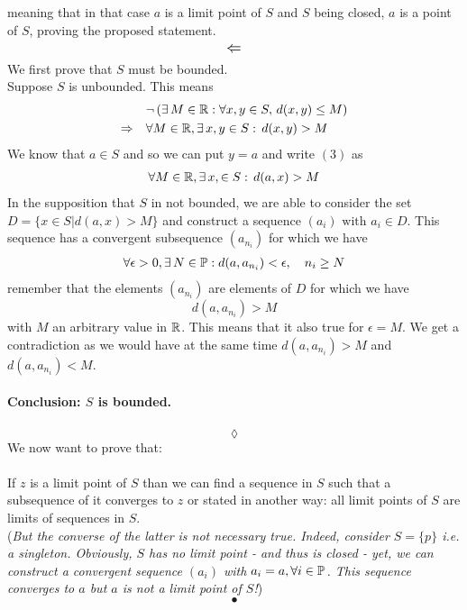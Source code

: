 meaning that in that case $a$ is a limit point of $S$ and $S$ being closed, $a$ is a point of $S$, proving the proposed statement.\newpage
$$\mathbf{\mathlarger{\Leftarrow}}$$
We first prove that $S$ must be bounded.\\
Suppose $S$ is unbounded. This means
\begin{align}
&\neg\left(\exists\, M\in\mathbb{R}:\forall x,y\in S,\, d(x,y)\leq M\right)\\
\Rightarrow\quad &\forall M\in\mathbb{R},\exists\, x,y\in S:\, d(x,y)> M
\end{align}
We know that $a\in S$ and so we can put $y=a$ and write  $(3)$ as 
\begin{align*}
\forall M\in\mathbb{R},\exists\, x,\in S:\, d(a,x)> M
\end{align*}
In the supposition that $S$ in not bounded, we are able to consider the set $D=\{ x\in S|d(a,x)>M\}$ and construct a sequence $(a_i)\text{ with } a_i\in D$. This sequence has a convergent subsequence $(a_{n_i})$ for which we have 
\begin{align*}
\forall \epsilon>0,\exists\, N\in\mathbb{P}: d(a,a_{n_i})<\epsilon,\quad  n_i\geq N
\end{align*}
remember that the elements $(a_{n_i})$ are elements of $D$ for which we have 
$$d(a,a_{n_i})>M$$
with $M$ an arbitrary value in $\mathbb{R}$. This means that it also true for $\epsilon =M$. We get a contradiction as we would have at the same time $d(a,a_{n_i}) >M$ and $d(a,a_{n_i})<M$.\\\\
\textbf{Conclusion: $S$ is bounded.}\\\\
$$\lozenge$$
We now want to prove that:\\\\
If $z$ is a limit point of $S$ than we can find a sequence in $S$ such that a subsequence of it converges to $z$ or stated in another way: all limit points of $S$ are limits of sequences in $S$. \\
(\textit{But the converse of the latter is not necessary true. Indeed, consider $S=\{p\}$ i.e. a singleton. Obviously, $S$ has no limit point - and thus is closed - yet, we can construct a convergent sequence $(a_i)$ with $a_i=a,\forall i\in \mathbb{P}$. This sequence converges to $a$ but $a$ is not a  limit point of $S$!})
$$\bullet$$

